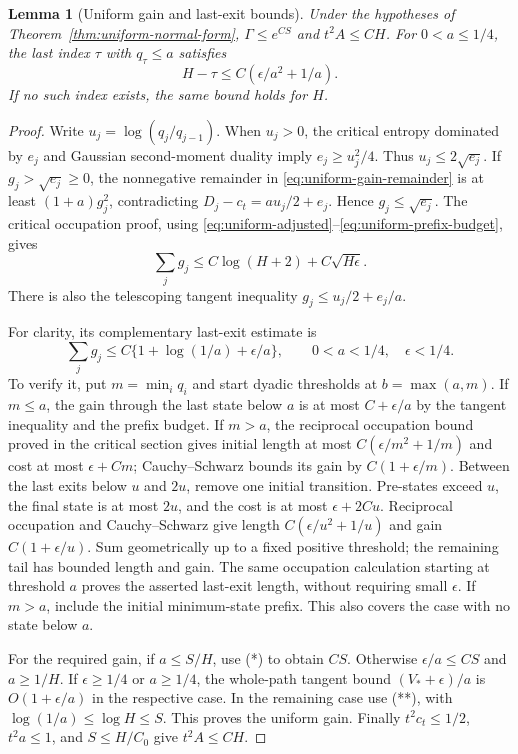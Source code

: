 \documentclass[11pt]{article}
\newtheorem{lemma}[theorem]{Lemma}
\theoremstyle{remark}
\begin{document}
\begin{lemma}[Uniform gain and last-exit bounds]
\label{lem:uniform-gain-prefix}
Under the hypotheses of Theorem~\ref{thm:uniform-normal-form},
$\Gamma\le e^{CS}$ and $t^2A\le CH$. For $0<a\le1/4$,
the last index $\tau$ with $q_\tau\le a$ satisfies
\[
 H-\tau\le C(\epsilon/a^2+1/a).
\]
If no such index exists, the same bound holds for $H$.
\end{lemma}
\begin{proof}
Write $u_j=\log(q_j/q_{j-1})$. When $u_j>0$,
the critical entropy dominated by $e_j$ and Gaussian
second-moment duality imply $e_j\ge u_j^2/4$.
Thus $u_j\le2\sqrt{e_j}$. If $g_j>\sqrt{e_j}\ge0$,
the nonnegative remainder in
\eqref{eq:uniform-gain-remainder} is at least
$(1+a)g_j^2$, contradicting
$D_j-c_t=au_j/2+e_j$.
Hence $g_j\le\sqrt{e_j}$. The critical occupation proof,
using \eqref{eq:uniform-adjusted}--\eqref{eq:uniform-prefix-budget},
gives
\[
 \sum_jg_j\le C\log(H+2)+C\sqrt{H\epsilon}.
 \tag{*}
\]
There is also the telescoping tangent inequality
$g_j\le u_j/2+e_j/a$.

For clarity, its complementary last-exit estimate is
\[
 \sum_jg_j\le C\{1+\log(1/a)+\epsilon/a\},
 \qquad 0<a<1/4,\quad\epsilon<1/4.
 \tag{**}
\]
To verify it, put $m=\min_iq_i$ and start dyadic thresholds
at $b=\max(a,m)$. If $m\le a$, the gain through the last
state below $a$ is at most $C+\epsilon/a$ by the tangent
inequality and the prefix budget. If $m>a$, the reciprocal
occupation bound proved in the critical section gives initial
length at most $C(\epsilon/m^2+1/m)$ and cost at most
$\epsilon+Cm$; Cauchy--Schwarz bounds its gain by
$C(1+\epsilon/m)$. Between the last exits below $u$ and
$2u$, remove one initial transition. Pre-states exceed $u$,
the final state is at most $2u$, and the cost is at most
$\epsilon+2Cu$. Reciprocal occupation and Cauchy--Schwarz
give length $C(\epsilon/u^2+1/u)$ and gain
$C(1+\epsilon/u)$. Sum geometrically up to a fixed positive
threshold; the remaining tail has bounded length and gain.
The same occupation calculation starting at threshold $a$
proves the asserted last-exit length, without requiring small
$\epsilon$. If $m>a$, include the initial minimum-state
prefix. This also covers the case with no state below $a$.

For the required gain, if $a\le S/H$, use (*) to obtain
$CS$. Otherwise $\epsilon/a\le CS$ and $a\ge1/H$.
If $\epsilon\ge1/4$ or $a\ge1/4$, the whole-path tangent
bound $(V_*+\epsilon)/a$ is $O(1+\epsilon/a)$ in the
respective case. In the remaining case use (**), with
$\log(1/a)\le\log H\le S$. This proves the uniform gain.
Finally $t^2c_t\le1/2$, $t^2a\le1$, and $S\le H/C_0$
give $t^2A\le CH$.
\end{proof}
\end{document}
